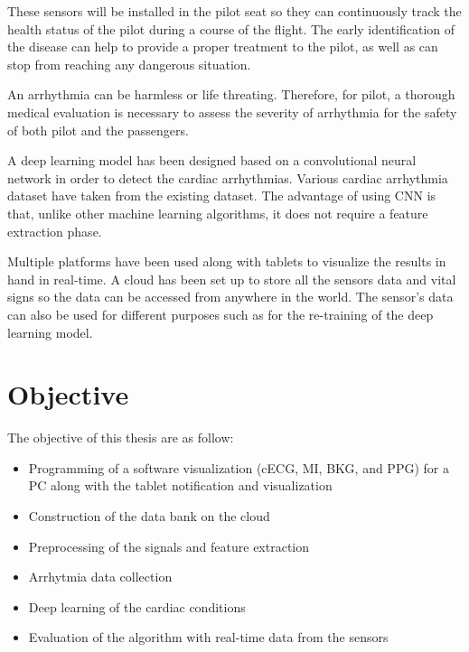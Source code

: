 These sensors will be installed in the pilot seat so they can continuously track the health status of the pilot during a course of the flight. The early identification of the disease can help to provide a proper treatment to the pilot, as well as can stop from reaching any dangerous situation.

An arrhythmia can be harmless or life threating. Therefore, for pilot, a thorough medical evaluation is necessary to assess the severity of arrhythmia for the safety of both pilot and the passengers.


A deep learning model has been designed based on a convolutional neural network in order to detect the cardiac arrhythmias. Various cardiac arrhythmia dataset have taken from the existing dataset. The advantage of using CNN is that, unlike other machine learning algorithms, it does not require a feature extraction phase.

Multiple platforms have been used along with tablets to visualize the results in hand in real-time. A cloud has been set up to store all the sensors data and vital signs so the data can be accessed from anywhere in the world.
The sensor's data can also be used for different purposes such as for the re-training of the deep learning model.



\section{Objective}
The objective of this thesis are as follow:

\begin{itemize}
	\item Programming of a software visualization (cECG, MI, BKG, and PPG) for a PC along with the tablet notification and visualization
	\item Construction of the data bank on the cloud
	\item Preprocessing of the signals and feature extraction
	\item Arrhytmia data collection
	\item Deep learning of the cardiac conditions
	\item Evaluation of the algorithm with real-time data from the sensors
\end{itemize}
